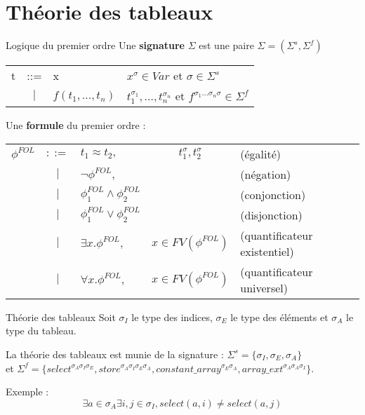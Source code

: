 \documentclass[]{beamer}
\begin{document}
\section{Th\'eorie des tableaux}

\begin{frame}
\tableofcontents[currentsection]
\end{frame}






\begin{frame}{Logique du premier ordre}
	Une \textbf{signature} $\Sigma$ est une paire $\Sigma=(\Sigma^s,\Sigma^f)$
	
	\begin{tabular}{lcll}
t & ::= & x & $x^\sigma\in Var$ et $\sigma\in\Sigma^s$\\
 & $|$ & $f(t_1,\ldots,t_n)$ & $t_1^{\sigma_1},\ldots,t_n^{\sigma_n}$ et $f^{\sigma_1\ldots\sigma_n\sigma}\in\Sigma^f$
 
\end{tabular}

Une \textbf{formule} du premier ordre :

\begin{tabular}{lclcl}
$\phi^{FOL}$ & $::=$ &  $t_{1} \approx t_{2},$ & $t_{1}^{\sigma},t_{2}^{\sigma}$ & (\'egalit\'e)\\
 & $|$ & $\neg\phi^{FOL},$ & & (n\'egation)\\
 & $|$ & $\phi_{1}^{FOL} \land \phi_{2}^{FOL}$ & & (conjonction)\\
 & $|$ & $\phi_{1}^{FOL} \lor \phi_{2}^{FOL}$ & & (disjonction)\\
 & $|$ & $\exists x.\phi^{FOL},$ & $x\in FV(\phi^{FOL})$ & (quantificateur existentiel)\\
 & $|$ & $\forall x.\phi^{FOL},$ & $x\in FV(\phi^{FOL})$ & (quantificateur universel)

\end{tabular}
\end{frame}







\begin{frame}[fragile]{Th\'eorie des tableaux}
	Soit $\sigma_I$ le type des indices, $\sigma_E$ le type des \'el\'ements et $\sigma_A$ le type du tableau.
	
	La th\'eorie des tableaux est munie de la signature : $\Sigma^s=\{\sigma_I,\sigma_E,\sigma_A\}$ \\et $\Sigma^f=\{select^{\sigma_A\sigma_I\sigma_E},store^{\sigma_A\sigma_I\sigma_E\sigma_A},constant\_array^{\sigma_E\sigma_A},array\_ext^{\sigma_A\sigma_A\sigma_I}\}$.
	
Exemple :
	\[\exists a\in\sigma_A \exists i,j\in\sigma_I, select(a,i)\neq select(a,j)\]

\end{frame}
\end{document}
